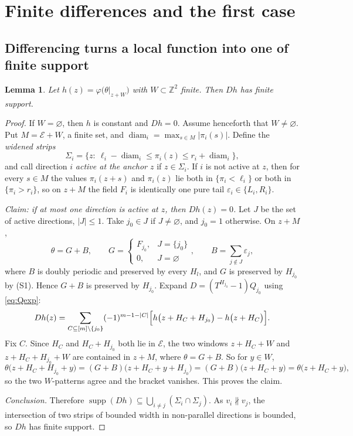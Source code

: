\documentclass[11pt,reqno]{amsart}
\theoremstyle{plain}
\newtheorem{lem}[thm]{Lemma}
\theoremstyle{definition}
\theoremstyle{remark}
\theoremstyle{plain}
\theoremstyle{remark}
\theoremstyle{definition}
\numberwithin{equation}{section}
\DeclareMathOperator{\supp}{supp}
\DeclareMathOperator{\diam}{diam}
\newcommand{\Z}{\mathbb{Z}}
\newcommand{\cE}{\mathcal{E}}
\begin{document}
\section{Finite differences and the first case}\label{sec:firstcase}

\subsection{Differencing turns a local function into one of finite support}

\begin{lem}\label{lem:finite-support}
Let $h(z)=\varphi\bigl(\theta|_{z+W}\bigr)$ with $W\subset\Z^2$ finite.  Then
$Dh$ has finite support.
\end{lem}

\begin{proof}
If $W=\varnothing$, then $h$ is constant and $Dh=0$.  Assume henceforth that
$W\ne\varnothing$.
Put $M=\cE+W$, a finite set, and $\diam_i=\max_{s\in M}|\pi_i(s)|$.  Define the
\emph{widened strips}
\[\Sigma_i=\bigl\{z:\ \ell_i-\diam_i\le\pi_i(z)\le r_i+\diam_i\bigr\},\]
and call direction $i$ \emph{active at the anchor $z$} if $z\in\Sigma_i$.  If
$i$ is not active at $z$, then for every $s\in M$ the values $\pi_i(z+s)$ and
$\pi_i(z)$ lie both in $\{\pi_i<\ell_i\}$ or both in $\{\pi_i>r_i\}$, so on
$z+M$ the field $F_i$ is identically one pure tail
$\varepsilon_i\in\{L_i,R_i\}$.

\smallskip\noindent\emph{Claim: if at most one direction is active at $z$, then
$Dh(z)=0$.}  Let $J$ be the set of active directions, $|J|\le1$.  Take
$j_0\in J$ if $J\ne\varnothing$, and $j_0=1$ otherwise.  On $z+M$,
\[\theta=G+B,\qquad
  G=\begin{cases}F_{j_0},&J=\{j_0\}\\ 0,&J=\varnothing\end{cases},\qquad
  B=\sum_{j\notin J}\varepsilon_j ,\]
where $B$ is doubly periodic and preserved by every $H_l$, and $G$ is preserved
by $H_{j_0}$ by \textup{(S1)}.  Hence $G+B$ is preserved by $H_{j_0}$.  Expand
$D=(T^{H_{j_0}}-1)Q_{j_0}$ using \eqref{eq:Qexp}:
\[Dh(z)=\sum_{C\subseteq[m]\setminus\{j_0\}}(-1)^{m-1-|C|}
  \Bigl[h\bigl(z+H_C+H_{j_0}\bigr)-h\bigl(z+H_C\bigr)\Bigr].\]
Fix $C$.  Since $H_C$ and $H_C+H_{j_0}$ both lie in $\cE$, the two windows
$z+H_C+W$ and $z+H_C+H_{j_0}+W$ are contained in $z+M$, where $\theta=G+B$.  So
for $y\in W$,
\[\theta\bigl(z+H_C+H_{j_0}+y\bigr)=(G+B)\bigl(z+H_C+y+H_{j_0}\bigr)
 =(G+B)\bigl(z+H_C+y\bigr)=\theta\bigl(z+H_C+y\bigr),\]
so the two $W$-patterns agree and the bracket vanishes.  This proves the claim.

\smallskip\noindent\emph{Conclusion.}  Therefore
$\supp(Dh)\subseteq\bigcup_{i\ne j}(\Sigma_i\cap\Sigma_j)$.  As
$v_i\not\parallel v_j$, the intersection of two strips of bounded width in
non-parallel directions is bounded, so $Dh$ has finite support.
\end{proof}
\end{document}
